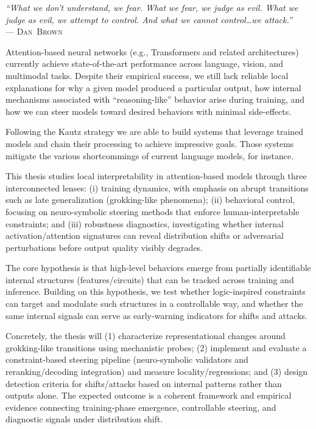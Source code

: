 \documentclass[../infufrgs/ppgc-tese.tex]{subfiles}
\begin{document}
\begin{flushright}
\mbox{}%
{\sffamily\itshape
``What we don't understand, we fear. What we fear, we judge as evil. What we judge as evil, we attempt to control. And what we cannot control\dots we attack.'' \\}
--- \textsc{Dan~Brown}
\end{flushright}


Attention-based neural networks (e.g., Transformers and related architectures) currently achieve state-of-the-art performance across language, vision, and multimodal tasks. Despite their empirical success, we still lack reliable local explanations for why a given model produced a particular output, how internal mechanisms associated with “reasoning-like” behavior arise during training, and how we can steer models toward desired behaviors with minimal side-effects. 

Following the Kautz strategy \cite{kautz2022thirdaisummer} we are able to build systems that leverage trained models and chain their processing to achieve impressive goals. Those systems mitigate the various shortcommings of current language models, for instance.

This thesis studies local interpretability in attention-based models through three interconnected lenses: (i) training dynamics, with emphasis on abrupt transitions such as late generalization (grokking-like phenomena); (ii) behavioral control, focusing on neuro-symbolic steering methods that enforce human-interpretable constraints; and (iii) robustness diagnostics, investigating whether internal activation/attention signatures can reveal distribution shifts or adversarial perturbations before output quality visibly degrades. 

The core hypothesis is that high-level behaviors emerge from partially identifiable internal structures (features/circuits) that can be tracked across training and inference. Building on this hypothesis, we test whether logic-inspired constraints can target and modulate such structures in a controllable way, and whether the same internal signals can serve as early-warning indicators for shifts and attacks. 

Concretely, the thesis will
(1) characterize representational changes around grokking-like transitions using mechanistic probes;
(2) implement and evaluate a constraint-based steering pipeline (neuro-symbolic validators and reranking/decoding integration) and measure locality/regressions; and
(3) design detection criteria for shifts/attacks based on internal patterns rather than outputs alone.
The expected outcome is a coherent framework and empirical evidence connecting training-phase emergence, controllable steering, and diagnostic signals under distribution shift. 
\end{document}
